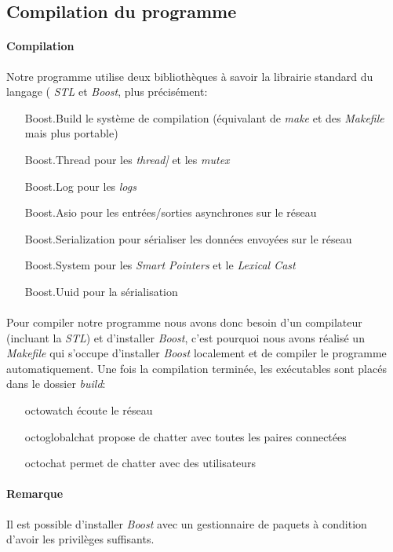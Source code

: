 \documentclass[a4paper]{article}
\begin{document}
		\subsection{Compilation du programme}
			\paragraph{Compilation}{
			Notre programme utilise deux bibliothèques à savoir la librairie standard du langage ( \textit{STL} et \textit{Boost}, plus précisément:
			\begin{itemize}
				\item[Boost.Build] le système de compilation (équivalant de \textit{make} et des \textit{Makefile} mais plus portable)
				\item[Boost.Thread] pour les \textit{thread]} et les \textit{mutex}
				\item[Boost.Log] pour les \textit{logs}
				\item[Boost.Asio] pour les entrées/sorties asynchrones sur le réseau
				\item[Boost.Serialization] pour sérialiser les données envoyées sur le réseau
				\item[Boost.System] pour les \textit{Smart Pointers} et le \textit{Lexical Cast}
				\item[Boost.Uuid] pour la sérialisation
			\end{itemize}
			}
			\paragraph{}{
			Pour compiler notre programme nous avons donc besoin d’un compilateur (incluant la \textit{STL})
			et d’installer \textit{Boost}, c’est pourquoi nous avons réalisé un \textit{Makefile} qui s’occupe
			d’installer \textit{Boost} localement et de compiler le programme automatiquement.
			Une fois la compilation terminée, les exécutables sont placés dans le dossier \textit{build}:
			\begin{itemize}
				\item[octowatch] écoute le réseau
				\item[octoglobalchat] propose de chatter avec toutes les paires connectées
				\item[octochat] permet de chatter avec des utilisateurs
			\end{itemize}

			}
			\paragraph{Remarque}{
				Il est possible d’installer \textit{Boost} avec un gestionnaire de paquets à condition d’avoir les privilèges suffisants.
			}
\end{document}
